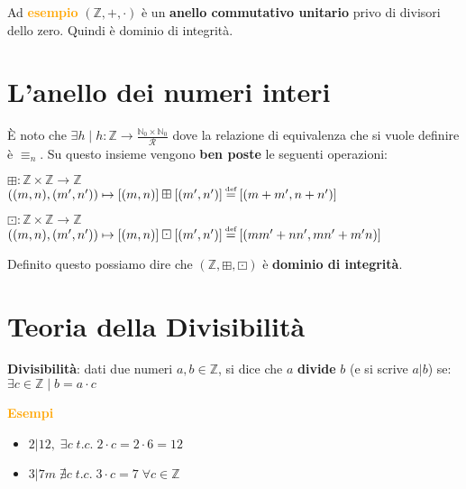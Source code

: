 \begin{boxA}
    Ad \textcolor{orange}{\textbf{esempio}} $(\mathbb{Z}, +, \cdot)$ è un \textbf{anello commutativo unitario} privo di divisori dello zero. Quindi è dominio di integrità.
\end{boxA}

\section{L'anello dei numeri interi}
È noto che $\exists h \; | \; h : \mathbb{Z} \rightarrow \frac{\mathbb{N}_0 \times \mathbb{N}_0}{\mathcal{R}}$ dove la relazione di equivalenza che si vuole definire è $\equiv_n$. Su questo insieme vengono \textbf{ben poste} le seguenti operazioni:
\begin{center}
    $\boxplus : \mathbb{Z} \times \mathbb{Z} \rightarrow \mathbb{Z}$ \\
    $((m, n), (m', n')) \mapsto [(m, n)] \boxplus [(m', n')] \myeq [(m + m', n + n')]$

    $\boxdot : \mathbb{Z} \times \mathbb{Z} \rightarrow \mathbb{Z}$ \\
    $((m, n), (m', n')) \mapsto [(m, n)] \boxdot [(m', n')] \myeq [(mm' + nn', mn' + m'n)]$
\end{center}
Definito questo possiamo dire che $(\mathbb{Z}, \boxplus, \boxdot)$ è \textbf{dominio di integrità}.

\section{Teoria della Divisibilità}
\textbf{Divisibilità}: dati due numeri $a,b \in \mathbb{Z}$, si dice che $a$ \textbf{divide} $b$ (e si scrive $a|b$) se: $\exists c \in \mathbb{Z} \; | \; b = a \cdot c$
\begin{boxA}
    \textcolor{orange}{\textbf{Esempi}}
    \begin{itemize}[nosep]
        \item $2|12, \; \exists c \; t.c. \; 2 \cdot c = 2 \cdot 6 = 12$
        \item $3|7m \; \nexists c \; t.c. \; 3 \cdot c = 7 \; \forall c \in \mathbb{Z}$
    \end{itemize}
\end{boxA}

